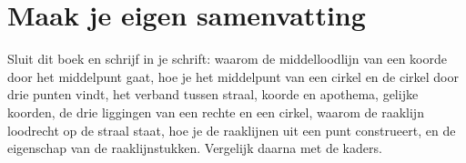 \ifzelfstudie
\section*{Maak je eigen samenvatting}
Sluit dit boek en schrijf in je schrift: waarom de middelloodlijn van een koorde door het middelpunt gaat, hoe je het middelpunt van een cirkel en de cirkel door drie punten vindt, het verband tussen straal, koorde en apothema, gelijke koorden, de drie liggingen van een rechte en een cirkel, waarom de raaklijn loodrecht op de straal staat, hoe je de raaklijnen uit een punt construeert, en de eigenschap van de raaklijnstukken. Vergelijk daarna met de kaders.
\fi
